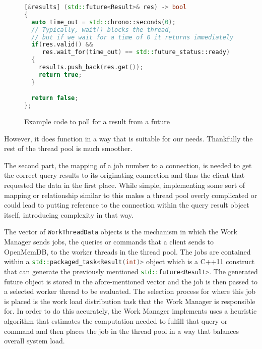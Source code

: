 \documentclass[letterpaper, 12pt]{article}
\newcommand{\inlinecode}[1]{\colorbox{codegrey}{\lstinline[language=C++]{#1}}}
\begin{document}
  \begin{figure}
  \label{code:clunk_future}
  \begin{lstlisting}[language=C++]
[&results] (std::future<Result>& res) -> bool
{
  auto time_out = std::chrono::seconds(0);
  // Typically, wait() blocks the thread,
  // but if we wait for a time of 0 it returns immediately
  if(res.valid() &&
     res.wait_for(time_out) == std::future_status::ready)
  {
    results.push_back(res.get());
    return true;
  }

  return false;
};
  \end{lstlisting}
  
  \caption{Example code to poll for a result from a future}
  \end{figure}
  
  However, it does function in a way that is suitable for our needs. Thankfully the rest of the thread
  pool is much smoother.
  \par\vspace{\baselineskip}
  The second part, the mapping of a job number to a connection, is needed to get the correct query results
  to its originating connection and thus the client that requested the data in the first place. While simple,
  implementing some sort of mapping or relationship similar to this makes a thread pool overly complicated
  or could lead to putting reference to the connection within the query result object itself, introducing
  complexity in that way.
  \par\vspace{\baselineskip}
  The vector of \inlinecode{WorkThreadData} objects is the mechanism in
  which the Work Manager sends jobs, the queries or commands that a client sends to OpenMemDB, to the
  worker threads in the thread pool. The jobs are contained within a \inlinecode{std::packaged_task<Result(int)>}
  object which is a C++11 construct that can generate the previously mentioned \inlinecode{std::future<Result>}.
  The generated future object is stored in the afore-mentioned vector and the job is then passed to a selected
  worker thread to be evaluated. The selection process for where this job is placed is the work load distribution
  task that the Work Manager is responsible for. In order to do this accurately, the Work Manager implements
  uses a heuristic algorithm that estimates the computation needed to fulfill that query or command
  and then places the job in the thread pool in a way that balances overall system load.
  \par\vspace{\baselineskip}
\end{document}
